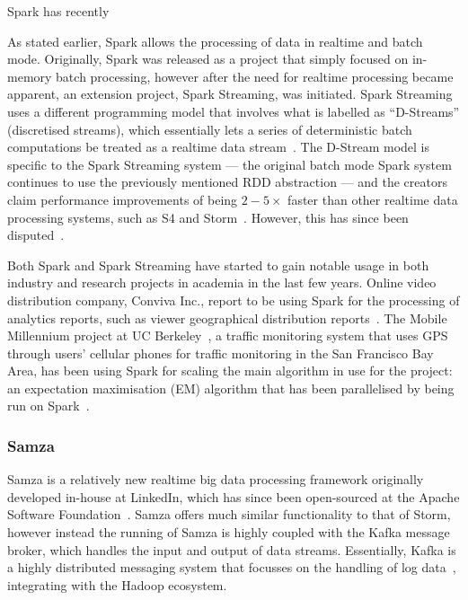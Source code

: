 Spark has recently %

As stated earlier, Spark allows the processing of data in realtime and batch mode. Originally, Spark was released as a
project that simply focused on in-memory batch processing, however after the need for realtime processing became apparent, an
extension project, Spark Streaming, was initiated. Spark Streaming uses a different programming model that involves what
is labelled as ``D-Streams'' (discretised streams), which essentially lets a series of deterministic batch computations
be treated as a realtime data stream~\cite{zaharia2012discretized}. The D-Stream model is specific to the Spark Streaming
system --- the original batch mode Spark system continues to use the previously mentioned RDD abstraction --- and the
creators claim performance improvements of being $2-5\times$ faster than  other realtime data processing systems, such as S4
and Storm~\cite{zaharia2013discretized}. However, this has since been disputed~\cite{web_slideshare_b}.

Both Spark and Spark Streaming have started to gain notable usage in both industry and research projects in academia in
the last few years. Online video distribution company, Conviva Inc., report to be using Spark for the processing of
analytics reports, such as viewer geographical distribution reports~\cite{web_spark_conviva,zaharia2012fast}. The Mobile
Millennium project at UC Berkeley~\cite{web_spark_mmp}, a traffic monitoring system that uses GPS through users'
cellular phones for traffic monitoring in the San Francisco Bay Area, has been using Spark for scaling the main
algorithm in use for the project: an expectation maximisation (EM) algorithm that has been parallelised by being run on
Spark~\cite{hunter2011scaling}.


\subsubsection{Samza} %
\label{ssub:samza}

Samza is a relatively new realtime big data processing framework originally developed in-house at LinkedIn, which has since been
open-sourced at the Apache Software Foundation~\cite{web_samza}. Samza offers much similar functionality to that of
Storm, however instead the running of Samza is highly coupled with the Kafka message broker, which handles the input
and output of data streams. Essentially, Kafka is a highly distributed messaging system that focusses on the handling
of log data~\cite{kreps2011kafka}, integrating with the Hadoop ecosystem.

